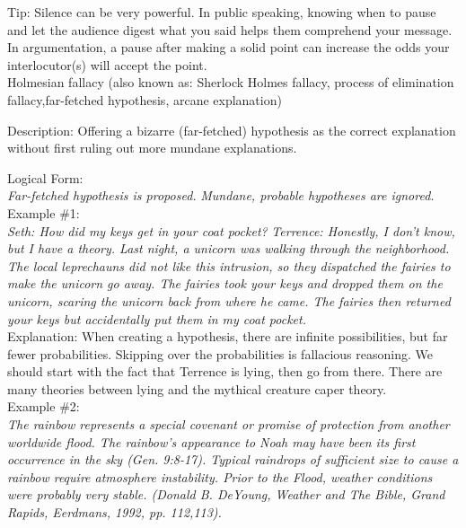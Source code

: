 \documentclass[a4paper,12pt,single,pdftex]{scrartcl}
\begin{document}
    
      Tip: Silence can be very powerful. In public speaking, knowing when to pause and let the audience digest what you said helps them comprehend your message. In argumentation, a pause after making a solid point can increase the odds your interlocutor(s) will accept the point.
    \\

  

Holmesian fallacy
    (also known as: Sherlock Holmes fallacy, process of elimination fallacy,far-fetched hypothesis, arcane explanation)
  
    Description: Offering a bizarre (far-fetched) hypothesis as the correct explanation without first ruling out more mundane explanations.

    
      Logical Form:
    \\

    
      {\em Far-fetched hypothesis is proposed.} \newline
{\em Mundane, probable hypotheses are ignored.}
    \\

    
      Example \#1:
    \\

    
      {\em Seth: How did my keys get in your coat pocket?} \newline
{\em Terrence: Honestly, I don’t know,  but I have a theory.  Last night, a unicorn was walking through the neighborhood.  The local leprechauns did not like this intrusion, so they dispatched the fairies to make the unicorn go away.  The fairies took your keys and dropped them on the unicorn, scaring the unicorn back from where he came.  The fairies then returned your keys but accidentally put them in my coat pocket.}
    \\

    
      Explanation: When creating a hypothesis, there are infinite possibilities, but far fewer probabilities.  Skipping over the probabilities is fallacious reasoning.  We should start with the fact that Terrence is lying, then go from there.  There are many theories between lying and the mythical creature caper theory.
    \\

    
      Example \#2:
    \\

    
      {\em The rainbow represents a special covenant or promise of protection from another worldwide flood. The rainbow's appearance to Noah may have been its first occurrence in the sky (Gen. 9:8-17). Typical raindrops of sufficient size to cause a rainbow require atmosphere instability. Prior to the Flood, weather conditions were probably very stable. (Donald B. DeYoung, Weather and The Bible, Grand Rapids, Eerdmans, 1992, pp. 112,113).}
    \\
\end{document}
